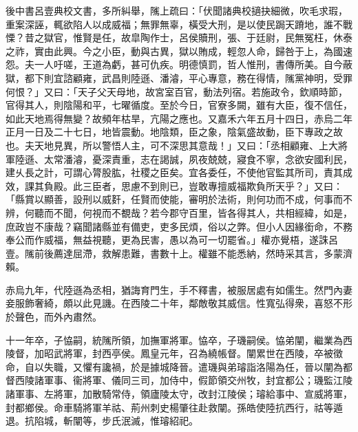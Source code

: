 \begin{pinyinscope}
 
後中書呂壹典校文書，多所糾舉，隲上疏曰：「伏聞諸典校擿抉細微，吹毛求瑕，重案深誣，輒欲陷人以成威福；無罪無辜，橫受大刑，是以使民跼天蹐地，誰不戰慄？昔之獄官，惟賢是任，故皐陶作士，呂侯贖刑，張、于廷尉，民無冤枉，休泰之祚，實由此興。今之小臣，動與古異，獄以賄成，輕忽人命，歸咎于上，為國速怨。夫一人吁嗟，王道為虧，甚可仇疾。明德慎罰，哲人惟刑，書傳所美。自今蔽獄，都下則宜諮顧雍，武昌則陸遜、潘濬，平心專意，務在得情，隲黨神明，受罪何恨？」又曰：「天子父天母地，故宮室百官，動法列宿。若施政令，欽順時節，官得其人，則陰陽和平，七曜循度。至於今日，官寮多闕，雖有大臣，復不信任，如此天地焉得無變？故頻年枯旱，亢陽之應也。又嘉禾六年五月十四日，赤烏二年正月一日及二十七日，地皆震動。地陰類，臣之象，陰氣盛故動，臣下專政之故也。夫天地見異，所以警悟人主，可不深思其意哉！」又曰：「丞相顧雍、上大將軍陸遜、太常潘濬，憂深責重，志在謁誠，夙夜兢兢，寢食不寧，念欲安國利民，建乆長之計，可謂心膂股肱，社稷之臣矣。宜各委任，不使他官監其所司，責其成效，課其負殿。此三臣者，思慮不到則已，豈敢專擅威福欺負所天乎？」又曰：「縣賞以顯善，設刑以威姧，任賢而使能，審明於法術，則何功而不成，何事而不辨，何聽而不聞，何視而不覩哉？若今郡守百里，皆各得其人，共相經緯，如是，庶政豈不康哉？竊聞諸縣並有備吏，吏多民煩，俗以之弊。但小人因緣銜命，不務奉公而作威福，無益視聽，更為民害，愚以為可一切罷省。」權亦覺梧，遂誅呂壹。隲前後薦達屈滯，救解患難，書數十上。權雖不能悉納，然時采其言，多蒙濟賴。
 
 
 
 
 赤烏九年，代陸遜為丞相，猶誨育門生，手不釋書，被服居處有如儒生。然門內妻妾服飾奢綺，頗以此見譏。在西陵二十年，鄰敵敬其威信。性寬弘得衆，喜怒不形於聲色，而外內肅然。
 
 
 
 
 十一年卒，子恊嗣，統隲所領，加撫軍將軍。恊卒，子璣嗣侯。恊弟闡，繼業為西陵督，加昭武將軍，封西亭侯。鳳皇元年，召為繞帳督。闡累世在西陵，卒被徵命，自以失職，又懼有讒禍，於是據城降晉。遣璣與弟璿詣洛陽為任，晉以闡為都督西陵諸軍事、衞將軍、儀同三司，加侍中，假節領交州牧，封宜都公；璣監江陵諸軍事、左將軍，加散騎常侍，領廬陵太守，改封江陵侯；璿給事中、宣威將軍，封都鄉侯。命車騎將軍羊祜、荊州刺史楊肇往赴救闡。孫皓使陸抗西行，祜等遁退。抗陷城，斬闡等，步氏泯滅，惟璿紹祀。
 
 
 

\end{pinyinscope}
